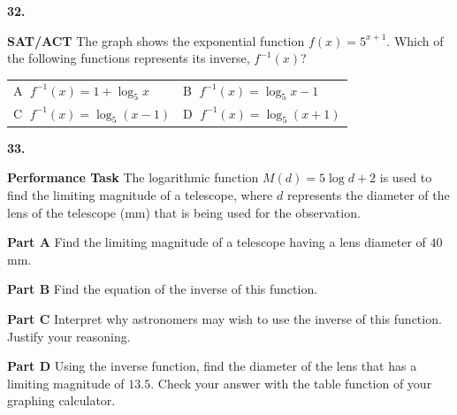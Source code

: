 \documentclass{article}
\newenvironment{practice}[2]{\textbf{#1.}\par}{\par}
\newcommand{\answer}[1]{}
\begin{document}
\begin{practice}{32}{}
\textbf{SAT/ACT} The graph shows the exponential function $f(x) = 5^{x+1}$. Which of the following functions represents its inverse, $f^{-1}(x)$?

\begin{center}
\end{center}

\begin{tabular}{ll}
\textcircled{A} $f^{-1}(x) = 1 + \log_5 x$ & \textcircled{B} $f^{-1}(x) = \log_5 x - 1$ \\
\textcircled{C} $f^{-1}(x) = \log_5 (x - 1)$ & \textcircled{D} $f^{-1}(x) = \log_5 (x + 1)$
\end{tabular}
\answer{}
\end{practice}

\begin{practice}{33}{}
\textbf{Performance Task} The logarithmic function $M(d) = 5 \log d + 2$ is used to find the limiting magnitude of a telescope, where $d$ represents the diameter of the lens of the telescope (mm) that is being used for the observation.

\textbf{Part A} Find the limiting magnitude of a telescope having a lens diameter of $40$ mm.

\textbf{Part B} Find the equation of the inverse of this function.

\textbf{Part C} Interpret why astronomers may wish to use the inverse of this function. Justify your reasoning.

\textbf{Part D} Using the inverse function, find the diameter of the lens that has a limiting magnitude of $13.5$. Check your answer with the table function of your graphing calculator.
\answer{}
\end{practice}
\end{document}
